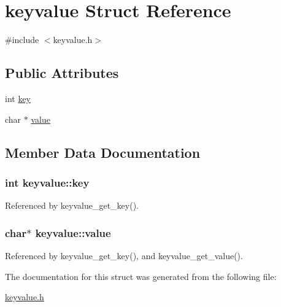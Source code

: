\hypertarget{structkeyvalue}{\section{keyvalue Struct Reference}
\label{structkeyvalue}
}


{\ttfamily \#include $<$keyvalue.\-h$>$}

\subsection*{Public Attributes}
\begin{DoxyCompactItemize}
\item 
int \hyperlink{structkeyvalue_aa2842248b58907bec328921d31332d00}{key}
\item 
char $\ast$ \hyperlink{structkeyvalue_a51a47e1dd26267d837be054f47a7bec1}{value}
\end{DoxyCompactItemize}


\subsection{Member Data Documentation}
\hypertarget{structkeyvalue_aa2842248b58907bec328921d31332d00}{
\subsubsection[{key}]{\setlength{\rightskip}{0pt plus 5cm}int keyvalue\-::key}}\label{structkeyvalue_aa2842248b58907bec328921d31332d00}


Referenced by keyvalue\-\_\-get\-\_\-key().

\hypertarget{structkeyvalue_a51a47e1dd26267d837be054f47a7bec1}{
\subsubsection[{value}]{\setlength{\rightskip}{0pt plus 5cm}char$\ast$ keyvalue\-::value}}\label{structkeyvalue_a51a47e1dd26267d837be054f47a7bec1}


Referenced by keyvalue\-\_\-get\-\_\-key(), and keyvalue\-\_\-get\-\_\-value().



The documentation for this struct was generated from the following file\-:\begin{DoxyCompactItemize}
\item 
\hyperlink{keyvalue_8h}{keyvalue.\-h}\end{DoxyCompactItemize}
